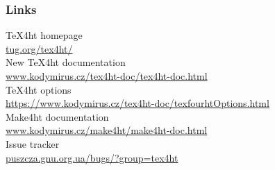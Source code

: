 \documentclass{beamer}
\begin{document}
\begin{frame}
   \frametitle{Links}
     \TeX4ht homepage \\ \url{tug.org/tex4ht/}\\
     New \TeX4ht documentation \\ \url{www.kodymirus.cz/tex4ht-doc/tex4ht-doc.html}\\
     \TeX4ht options\\
     \url{https://www.kodymirus.cz/tex4ht-doc/texfourhtOptions.html}\\
     Make4ht documentation \\ \url{www.kodymirus.cz/make4ht/make4ht-doc.html}\\
     Issue tracker\\
     \url{puszcza.gnu.org.ua/bugs/?group=tex4ht}\\

\end{frame}
\end{document}
